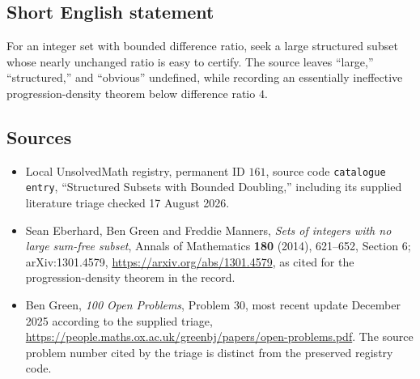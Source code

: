 \documentclass[11pt]{article}
\begin{document}
\subsection{Short English statement}
For an integer set with bounded difference ratio, seek a large structured subset whose nearly unchanged ratio is easy to certify. The source leaves ``large,'' ``structured,'' and ``obvious'' undefined, while recording an essentially ineffective progression-density theorem below difference ratio $4$.
\subsection{Sources}
\begin{itemize}
\item Local UnsolvedMath registry, permanent ID $161$, source code \texttt{catalogue entry}, ``Structured Subsets with Bounded Doubling,'' including its supplied literature triage checked 17 August 2026.
\item Sean Eberhard, Ben Green and Freddie Manners, \emph{Sets of integers with no large sum-free subset}, Annals of Mathematics \textbf{180} (2014), 621--652, Section 6; arXiv:1301.4579, \url{https://arxiv.org/abs/1301.4579}, as cited for the progression-density theorem in the record.
\item Ben Green, \emph{100 Open Problems}, Problem 30, most recent update December 2025 according to the supplied triage, \url{https://people.maths.ox.ac.uk/greenbj/papers/open-problems.pdf}. The source problem number cited by the triage is distinct from the preserved registry code.
\end{itemize}
\end{document}
